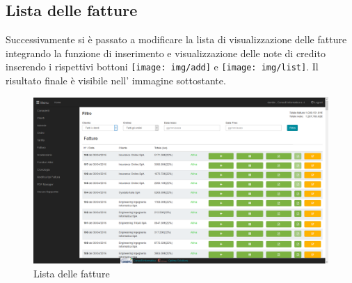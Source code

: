 \documentclass[12pt]{book}
\begin{document}
\subsection{Lista delle fatture}
Successivamente si è passato a modificare la lista di visualizzazione delle 
fatture 
integrando la funzione di inserimento e visualizzazione delle note di credito
inserendo i rispettivi bottoni \texttt{[image: img/add]} e 
\texttt{[image: img/list]}. 
Il risultato finale è visibile nell' immagine sottostante.
\begin{figure}[H]
    \centering
    \includegraphics[scale=0.4]{img/lista_fatture}
    \caption{Lista delle fatture}\label{img:lista_fatture}
\end{figure}
\end{document}
